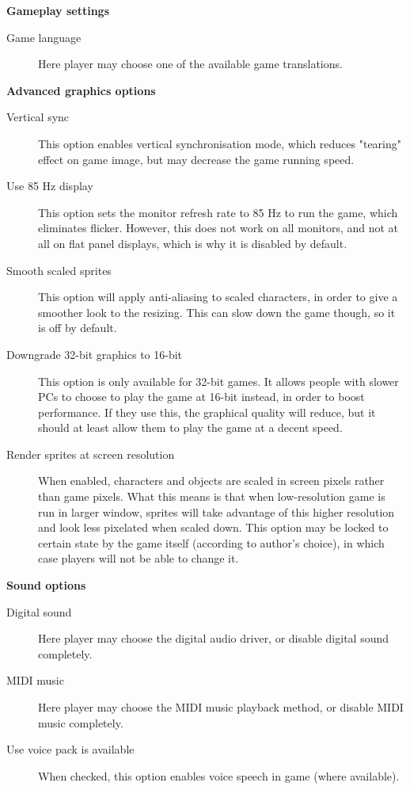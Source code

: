 \bf{Gameplay settings}

\begin{description}
\item [Game language]
  Here player may choose one of the available game translations.
\end{description}

\bf{Advanced graphics options}

\begin{description}
\item [Vertical sync]
  This option enables vertical synchronisation mode, which reduces "tearing" effect on game image, but may decrease the game running speed.
\item [Use 85 Hz display]
  This option sets the monitor refresh rate to 85 Hz to run the game, which eliminates flicker. However, this does not work on all monitors, and not at all on flat
panel displays, which is why it is disabled by default.
\item [Smooth scaled sprites]
  This option will apply anti-aliasing to scaled characters, in order to give
a smoother look to the resizing. This can slow down the game though, so it is off by default.
\item [Downgrade 32-bit graphics to 16-bit]
  This option is only available for 32-bit games. It allows people with slower PCs
to choose to play the game at 16-bit instead, in order to boost performance.
If they use this, the graphical quality will reduce, but it should at least allow them to play
the game at a decent speed.
\item [Render sprites at screen resolution]
  When enabled, characters and objects are scaled in screen pixels rather than game pixels.
What this means is that when low-resolution game is run in larger window, sprites will take advantage of this higher resolution and look less pixelated when scaled down. This option may be locked to certain state by the game itself (according to author's choice), in which case players will not be able to change it.
\end{description}

\bf{Sound options}

\begin{description}
\item [Digital sound]
  Here player may choose the digital audio driver, or disable digital sound completely.
\item [MIDI music]
  Here player may choose the MIDI music playback method, or disable MIDI music completely.
\item [Use voice pack is available]
  When checked, this option enables voice speech in game (where available).
\end{description}

